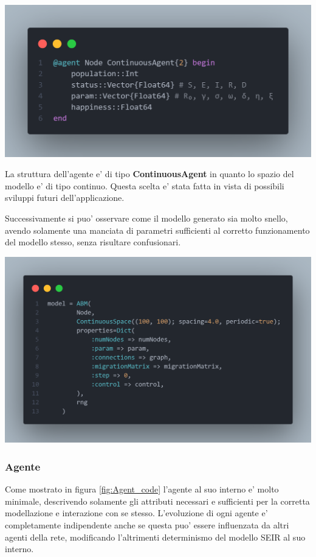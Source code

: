 \begin{minipage}{\linewidth}
    \centering
    \includegraphics[width=\textwidth]{img/node_agent.png}
    \label{fig:Agent_code}
\end{minipage}

La struttura dell'agente e' di tipo \textbf{ContinuousAgent} in quanto lo 
spazio del modello e' di tipo continuo. Questa scelta e' stata fatta in vista di possibili 
sviluppi futuri dell'applicazione.

Successivamente si puo' osservare come il modello generato sia molto snello,
avendo solamente una manciata di parametri sufficienti al corretto funzionamento 
del modello stesso, senza risultare confusionari. 

\begin{minipage}{\linewidth}
    \centering
    \includegraphics[width=\textwidth]{img/sngraph_model.png}
    \label{fig:Model_code}
\end{minipage}

\subsubsection*{Agente}
Come mostrato in figura \ref{fig:Agent_code} l'agente al suo interno e' molto minimale,
descrivendo solamente gli attributi necessari e sufficienti per la corretta modellazione
e interazione con se stesso. L'evoluzione di ogni agente e' completamente indipendente 
anche se questa puo' essere influenzata da altri agenti della rete, modificando l'altrimenti 
determinismo del modello SEIR al suo interno. 

